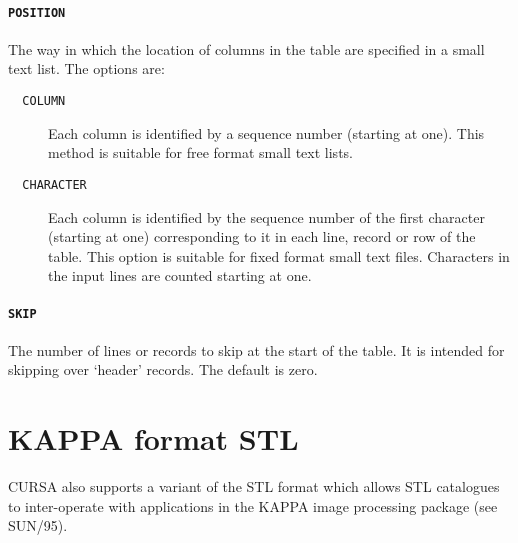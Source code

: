 \documentclass[twoside,11pt]{article}
\newcommand{\xref}[3]{#1}
\newcommand{\xlabel}[1]{}
\renewcommand{\_}{\texttt{\symbol{95}}}
\begin{document}
\paragraph{{\tt POSITION}} The way in which the location of columns in
the table are specified in a small text list.  The options are:

\begin{description}

  \item[{\tt ~~COLUMN}] Each column is identified by a sequence number
   (starting at one).  This method is suitable for free format small
   text lists.

  \item[{\tt ~~CHARACTER}] Each column is identified by the
   sequence number of the first character (starting at one)
   corresponding to it in each line, record or row of the table.  This
   option is suitable for
   fixed format small text files.
   Characters in the input lines are counted starting at one.

\end{description}



\paragraph{{\tt SKIP}} The number of lines or records to skip at the
start of the table.  It is intended for skipping over `header' records.
The default is zero.


\section{\xlabel{STLKAP}\label{STLKAP}KAPPA format STL}

CURSA also supports a variant of the STL format which allows STL
catalogues to inter-operate with applications in the KAPPA image
processing package (see \xref{SUN/95}{sun95}{}\cite{SUN95}).
\end{document}
